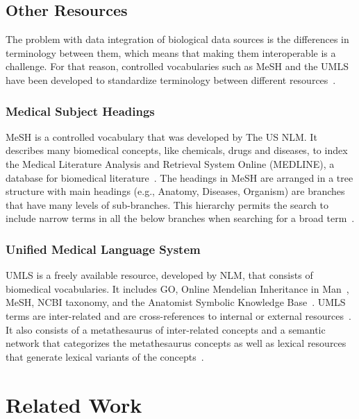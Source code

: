\subsection{Other Resources}

The problem with data integration of biological data sources is the differences in terminology between them, which means that making them interoperable is a challenge.
For that reason, controlled vocabularies such as \ac{MeSH} and the \ac{UMLS} have been developed to standardize terminology between different resources~\cite{bodenreider_unified_2004}.

\subsubsection{Medical Subject Headings}

\ac{MeSH} is a controlled vocabulary that was developed by The US \ac{NLM}.
It describes many biomedical concepts, like chemicals, drugs and diseases, to index the Medical Literature Analysis and Retrieval System Online (MEDLINE), a database for biomedical literature~\cite{huang_recommending_2011}.
The headings in \ac{MeSH} are arranged in a tree structure with main headings (e.g., Anatomy, Diseases, Organism) are branches that have many levels of sub-branches.
This hierarchy permits the search to include narrow terms in all the below branches when searching for a broad term~\cite{noauthor_introduction_nodate}.

\subsubsection{Unified Medical Language System}

\ac{UMLS} is a freely available resource, developed by \ac{NLM}, that consists of biomedical vocabularies.
It includes \ac{GO}, Online Mendelian Inheritance in Man~\cite{amberger_omim.org:_2015}, \ac{MeSH}, \ac{NCBI} taxonomy, and the Anatomist Symbolic Knowledge Base~\cite{rosse_motivation_1998}.
\ac{UMLS} terms are inter-related and are cross-references to internal or external resources~\cite{bodenreider_unified_2004}.
It also consists of a metathesaurus of inter-related concepts and a semantic network that categorizes the metathesaurus concepts as well as lexical resources that generate lexical variants of the concepts~\cite{bodenreider_unified_2004}.

\section{Related Work}

